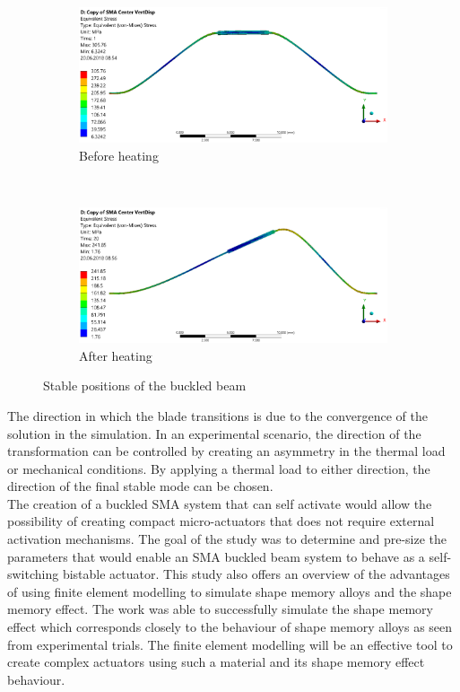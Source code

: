 \begin{figure}[H]
    \centering
    \begin{subfigure}[t]{0.45\textwidth}
			\includegraphics[width=\textwidth]{Figures/FigCentBumpBefore2x.eps}
			\caption{Before heating}
			\label{fig:modechangebefore}
    \end{subfigure}
		~
    \begin{subfigure}[t]{0.45\textwidth}
			\includegraphics[width=\textwidth]{Figures/FigCentBumpAfter2x.eps}
			\caption{After heating}
			\label{fig:modechangeafter}
    \end{subfigure}
		\caption{Stable positions of the buckled beam}
		\label{fig:modechange}
\end{figure}

The direction in which the blade transitions is due to the convergence of the solution in the simulation. In an experimental scenario, the direction of the transformation can be controlled by creating an asymmetry in the thermal load or mechanical conditions. By applying a thermal load to either direction, the direction of the final stable mode can be chosen.\\

The creation of a buckled SMA system that can self activate would allow the possibility of creating compact micro-actuators that does not require external activation mechanisms. The goal of the study was to determine and pre-size the parameters that would enable an SMA buckled beam system to behave as a self-switching bistable actuator. This study also offers an overview of the advantages of using finite element modelling to simulate shape memory alloys and the shape memory effect. The work was able to successfully simulate the shape memory effect which corresponds closely to the behaviour of shape memory alloys as seen from experimental trials. The finite element modelling will be an effective tool to create complex actuators using such a material and its shape memory effect behaviour.


